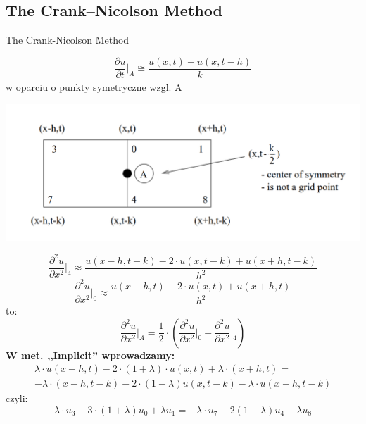 
\subsection{The Crank--Nicolson Method}
\begin{frame}{The Crank-Nicolson Method}

\begin{block}{}
 \end{block}
 
\begin{equation}\underline{\frac{\partial u}{\partial t} \Big \vert _{A}\cong \frac{u(x,t) - u(x,t - h)}{k}}\end{equation} w oparciu o punkty symetryczne wzgl. A
 
 \centerline{\includegraphics[width = 1 \linewidth]{img/23/crank}}
\end{frame}

\begin{frame}
\begin{equation} \frac{\partial ^2 u}{\partial x^2} \Big \vert _{4}\approx \frac{u(x - h,t - k) - 2 \cdot u(x,t - k) + u(x + h, t - k)}{h^2}\end{equation}
\begin{equation} \frac{\partial ^2 u}{\partial x^2} \Big \vert _{0}\approx \frac{u(x - h,t) - 2 \cdot u(x,t) + u(x + h, t)}{h^2} \end{equation}
to:
\begin{equation} \frac{\partial ^2 u}{\partial x^2} \big \vert _{A} = \frac{1}{2} \cdot \left ( \frac{\partial ^2 u}{\partial x^2} \Big \vert _{0} + \frac{\partial ^2 u}{\partial x^2} \Big \vert _{4} \right )\end{equation}
\textbf{W met. ,,Implicit'' wprowadzamy:}
\begin{multline} \lambda \cdot u(x-h,t) - 2 \cdot (1+\lambda)\cdot u(x,t) + \lambda \cdot (x+h,t) = \\
 -\lambda \cdot (x-h,t-k) - 2 \cdot (1-\lambda)u(x,t-k) - \lambda \cdot u(x+h,t-k)\end{multline}
czyli:
$$ \underline{\lambda \cdot u_3 - 3\cdot (1+\lambda)u_0 + \lambda u_1 = -\lambda \cdot u_7 - 2(1-\lambda)u_4 - \lambda u_8}$$
\end{frame}